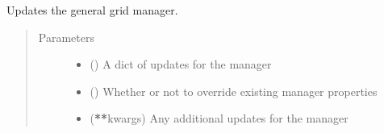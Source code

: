 \documentclass[letterpaper,10pt,english]{sphinxmanual}
\begin{document}
\begin{fulllineitems}
\begin{fulllineitems}
\label{\detokenize{builder:geohexviz.builder.PlotBuilder.update_grid_manager}}
\sphinxAtStartPar
Updates the general grid manager.
\begin{quote}\begin{description}
\item[{Parameters}] \leavevmode\begin{itemize}
\item {} 
\sphinxAtStartPar
{} () \textendash{} A dict of updates for the manager

\item {} 
\sphinxAtStartPar
{} () \textendash{} Whether or not to override existing manager properties

\item {} 
\sphinxAtStartPar
{} ({\color{red}\bfseries{}**}kwargs) \textendash{} Any additional updates for the manager

\end{itemize}

\end{description}\end{quote}

\end{fulllineitems}



\end{fulllineitems}
\end{document}
